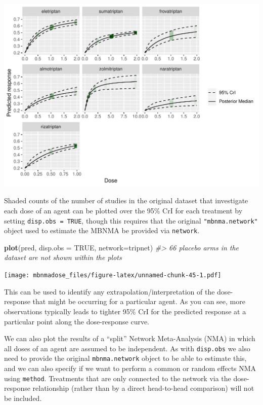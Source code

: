\documentclass[]{article}
\newenvironment{Shaded}{\begin{snugshade}}{\end{snugshade}}
\newcommand{\CommentTok}[1]{\textcolor[rgb]{0.56,0.35,0.01}{\textit{#1}}}
\newcommand{\DataTypeTok}[1]{\textcolor[rgb]{0.13,0.29,0.53}{#1}}
\newcommand{\KeywordTok}[1]{\textcolor[rgb]{0.13,0.29,0.53}{\textbf{#1}}}
\newcommand{\NormalTok}[1]{#1}
\newcommand{\OtherTok}[1]{\textcolor[rgb]{0.56,0.35,0.01}{#1}}
\begin{document}
\includegraphics{mbnmadose_files/figure-latex/unnamed-chunk-44-1.pdf}

Shaded counts of the number of studies in the original dataset that
investigate each dose of an agent can be plotted over the 95\% CrI for
each treatment by setting \texttt{disp.obs\ =\ TRUE}, though this
requires that the original \texttt{"mbnma.network"} object used to
estimate the MBNMA be provided via \texttt{network}.

\begin{Shaded}
\begin{Highlighting}[]
\KeywordTok{plot}\NormalTok{(pred, }\DataTypeTok{disp.obs =} \OtherTok{TRUE}\NormalTok{, }\DataTypeTok{network=}\NormalTok{tripnet)}
\CommentTok{#> 66 placebo arms in the dataset are not shown within the plots}
\end{Highlighting}
\end{Shaded}

\texttt{[image: mbnmadose\_files/figure-latex/unnamed-chunk-45-1.pdf]}

This can be used to identify any extrapolation/interpretation of the
dose-response that might be occurring for a particular agent. As you can
see, more observations typically leads to tighter 95\% CrI for the
predicted response at a particular point along the dose-response curve.

We can also plot the results of a ``split'' Network Meta-Analysis (NMA)
in which all doses of an agent are assumed to be independent. As with
\texttt{disp.obs} we also need to provide the original
\texttt{mbnma.network} object to be able to estimate this, and we can
also specify if we want to perform a common or random effects NMA using
\texttt{method}. Treatments that are only connected to the network via
the dose-response relationship (rather than by a direct head-to-head
comparison) will not be included.
\end{document}
